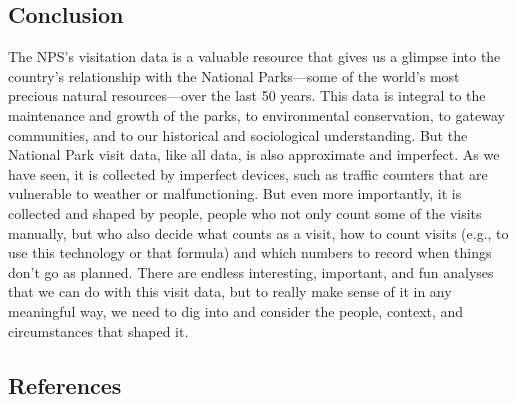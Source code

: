 \documentclass[
  letterpaper,
  DIV=11,
  numbers=noendperiod]{scrartcl}
\begin{document}
\subsection{Conclusion}\label{conclusion}

The NPS's visitation data is a valuable resource that gives us a glimpse
into the country's relationship with the National Parks---some of the
world's most precious natural resources---over the last 50 years. This
data is integral to the maintenance and growth of the parks, to
environmental conservation, to gateway communities, and to our
historical and sociological understanding. But the National Park visit
data, like all data, is also approximate and imperfect. As we have seen,
it is collected by imperfect devices, such as traffic counters that are
vulnerable to weather or malfunctioning. But even more importantly, it
is collected and shaped by people, people who not only count some of the
visits manually, but who also decide what counts as a visit, how to
count visits (e.g., to use this technology or that formula) and which
numbers to record when things don't go as planned. There are endless
interesting, important, and fun analyses that we can do with this visit
data, but to really make sense of it in any meaningful way, we need to
dig into and consider the people, context, and circumstances that shaped
it.

\subsection{References}\label{references}
\end{document}

